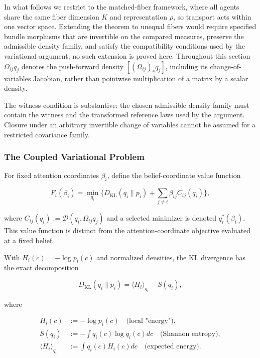 \documentclass[twoside,11pt]{article}
\begin{document}
In what follows we restrict to the matched-fiber framework, where all agents share the same fiber dimension $K$ and representation $\rho$, so transport acts within one vector space. Extending the theorem to unequal fibers would require specified bundle morphisms that are invertible on the compared measures, preserve the admissible density family, and satisfy the compatibility conditions used by the variational argument; no such extension is proved here. Throughout this section $\Omega_{ij}q_j$ denotes the push-forward density $[(\Omega_{ij})_*q_j]$, including its change-of-variables Jacobian, rather than pointwise multiplication of a matrix by a scalar density.

The witness condition is substantive: the chosen admissible density family must contain the witness and the transformed reference laws used by the argument. Closure under an arbitrary invertible change of variables cannot be assumed for a restricted covariance family.

\subsubsection{The Coupled Variational Problem}

For fixed attention coordinates $\beta_i$, define the belief-coordinate value function

\begin{equation}
F_i(\beta_i)
=\min_{q_i}
\Big\{
D_{\mathrm{KL}}(q_i \| p_i)
+ \sum_{j\neq i} \beta_{ij} C_{ij}(q_i)
\Big\},
\label{eq:F_i_supp}
\end{equation}

where $C_{ij}(q_i):=\mathcal{D}(q_i,\Omega_{ij}q_j)$ and a selected minimizer is denoted $q_i^*(\beta_i)$. This value function is distinct from the attention-coordinate objective evaluated at a fixed belief.

With $H_i(c)=-\log p_i(c)$ and normalized densities, the KL divergence has the exact decomposition

\begin{equation}
D_{\mathrm{KL}}(q_i \| p_i) = \langle H_i \rangle_{q_i} - S(q_i),
\end{equation}

where

\begin{align}
H_i(c) &:= -\log p_i(c) \quad \text{(local "energy")}, \\
S(q_i) &:= -\int q_i(c) \log q_i(c) dc \quad \text{(Shannon entropy)}, \\
\langle H_i \rangle_{q_i} &:= \int q_i(c) H_i(c) dc \quad \text{(expected energy)}.
\end{align}
\end{document}
